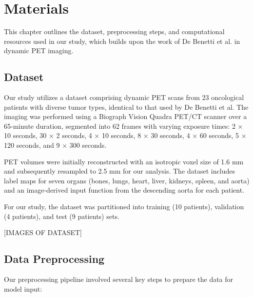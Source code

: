 
\chapter{Materials}\label{chapter:materials}
This chapter outlines the dataset, preprocessing steps, and computational resources used in our study, which builds upon the work of De Benetti et al. \cite{debenetti2023} in dynamic PET imaging.

\section{Dataset}
Our study utilizes a dataset comprising dynamic PET scans from 23 oncological patients with diverse tumor types, identical to that used by De Benetti et al. The imaging was performed using a Biograph Vision Quadra PET/CT scanner over a 65-minute duration, segmented into 62 frames with varying exposure times: 2 × 10 seconds, 30 × 2 seconds, 4 × 10 seconds, 8 × 30 seconds, 4 × 60 seconds, 5 × 120 seconds, and 9 × 300 seconds.

PET volumes were initially reconstructed with an isotropic voxel size of 1.6 mm and subsequently resampled to 2.5 mm for our analysis. The dataset includes label maps for seven organs (bones, lungs, heart, liver, kidneys, spleen, and aorta) and an image-derived input function from the descending aorta for each patient.

For our study, the dataset was partitioned into training (10 patients), validation (4 patients), and test (9 patients) sets.

[IMAGES OF DATASET]

\section{Data Preprocessing}
Our preprocessing pipeline involved several key steps to prepare the data for model input:

